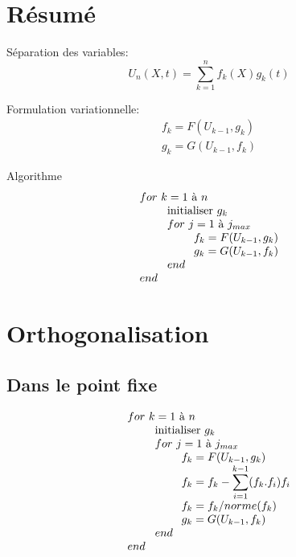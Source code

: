 \section{Résumé}

	
Séparation des variables:
\begin{equation}
	\displaystyle U_n(X,t) = \sum_{k=1}^n f_k(X) g_k(t)
\end{equation}

Formulation variationnelle:
\begin{equation}
\begin{array}{c}
 f_k = F (U_{k-1},g_k)\\
 g_k = G (U_{k-1},f_k)
\end{array}
\end{equation}

Algorithme
\begin{equation}{}
\begin{array}{l}
 for~k = 1$ à $ n \\
 \phantom{for~k} $initialiser $g_k \\
 \phantom{for~k} for~j=1$ à $j_{max} \\
 \phantom{for~k for~j } f_k = F (U_{k-1},g_k) \\
 \phantom{for~k for~j } g_k = G (U_{k-1},f_k) \\
 \phantom{for~k} end \\
end
\end{array}  \\
\end{equation}


\section{Orthogonalisation}

\subsection{Dans le point fixe}
\begin{equation}{}
\begin{array}{l}
 for~k = 1$ à $ n \\
 \phantom{for~k} $initialiser $g_k \\
 \phantom{for~k} for~j=1$ à $j_{max} \\
 \phantom{for~k for~j } f_k = F (U_{k-1},g_k) \\
 \displaystyle
 \phantom{for~k for~j } f_k = f_k - \sum_{i=1}^{k-1} (f_k.f_i)f_i\\
 \phantom{for~k for~j } f_k = f_k / norme(f_k)\\
 \phantom{for~k for~j } g_k = G (U_{k-1},f_k) \\
 \phantom{for~k} end \\
end
\end{array}  \\
\end{equation}

